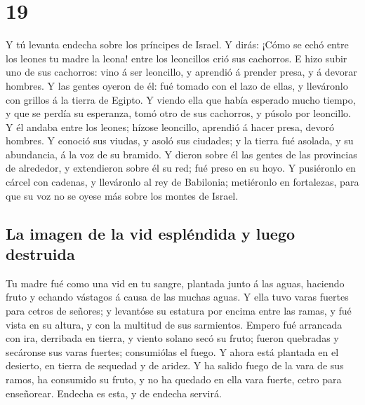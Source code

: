 \hypertarget{section-26-19}{%
\section{19}\label{section-26-19}}

 Y tú levanta endecha sobre los príncipes de Israel.
 Y dirás: ¡Cómo se echó entre los leones tu madre la
leona! entre los leoncillos crió sus cachorros.  E hizo
subir uno de sus cachorros: vino á ser leoncillo, y aprendió á prender
presa, y á devorar hombres.  Y las gentes oyeron de él:
fué tomado con el lazo de ellas, y lleváronlo con grillos á la tierra de
Egipto.  Y viendo ella que había esperado mucho tiempo, y
que se perdía su esperanza, tomó otro de sus cachorros, y púsolo por
leoncillo.  Y él andaba entre los leones; hízose
leoncillo, aprendió á hacer presa, devoró hombres.  Y
conoció sus viudas, y asoló sus ciudades; y la tierra fué asolada, y su
abundancia, á la voz de su bramido.  Y dieron sobre él las
gentes de las provincias de alrededor, y extendieron sobre él su red;
fué preso en su hoyo.  Y pusiéronlo en cárcel con cadenas,
y lleváronlo al rey de Babilonia; metiéronlo en fortalezas, para que su
voz no se oyese más sobre los montes de Israel.

\hypertarget{la-imagen-de-la-vid-espluxe9ndida-y-luego-destruida}{%
\subsection{La imagen de la vid espléndida y luego
destruida}\label{la-imagen-de-la-vid-espluxe9ndida-y-luego-destruida}}

 Tu madre fué como una vid en tu sangre, plantada junto á
las aguas, haciendo fruto y echando vástagos á causa de las muchas
aguas.  Y ella tuvo varas fuertes para cetros de señores;
y levantóse su estatura por encima entre las ramas, y fué vista en su
altura, y con la multitud de sus sarmientos.  Empero fué
arrancada con ira, derribada en tierra, y viento solano secó su fruto;
fueron quebradas y secáronse sus varas fuertes; consumiólas el fuego.
 Y ahora está plantada en el desierto, en tierra de
sequedad y de aridez.  Y ha salido fuego de la vara de
sus ramos, ha consumido su fruto, y no ha quedado en ella vara fuerte,
cetro para enseñorear. Endecha es esta, y de endecha servirá.

